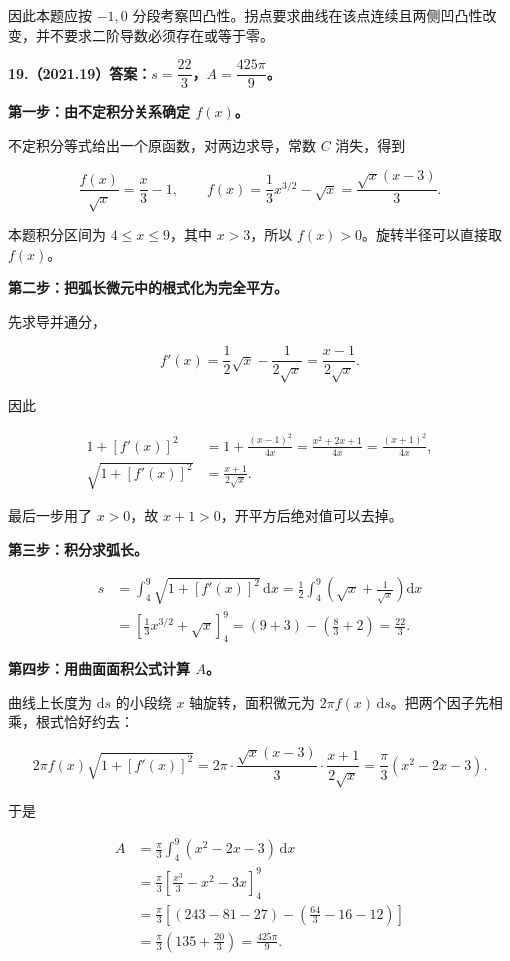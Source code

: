 \documentclass[UTF8,11pt,fontset=windows]{ctexart}
\begin{document}
因此本题应按 $-1,0$ 分段考察凹凸性。拐点要求曲线在该点连续且两侧凹凸性改变，并不要求二阶导数必须存在或等于零。

\clearpage

\textbf{19.（2021.19）答案：$s=\dfrac{22}{3}$，$A=\dfrac{425\pi}{9}$。}

\textbf{第一步：由不定积分关系确定 $f(x)$。}

不定积分等式给出一个原函数，对两边求导，常数 $C$ 消失，得到

$$
\frac{f(x)}{\sqrt x}=\frac x3-1,
\qquad f(x)=\frac13x^{3/2}-\sqrt x=\frac{\sqrt x(x-3)}3.
$$

本题积分区间为 $4\le x\le9$，其中 $x>3$，所以 $f(x)>0$。旋转半径可以直接取 $f(x)$。

\textbf{第二步：把弧长微元中的根式化为完全平方。}

先求导并通分，

$$
f'(x)=\frac12\sqrt x-\frac1{2\sqrt x}
=\frac{x-1}{2\sqrt x}.
$$

因此

$$
\begin{aligned}
1+[f'(x)]^2
&=1+\frac{(x-1)^2}{4x}
=\frac{x^2+2x+1}{4x}=\frac{(x+1)^2}{4x},\\
\sqrt{1+[f'(x)]^2}&=\frac{x+1}{2\sqrt x}.
\end{aligned}
$$

最后一步用了 $x>0$，故 $x+1>0$，开平方后绝对值可以去掉。

\textbf{第三步：积分求弧长。}

$$
\begin{aligned}
s&=\int_4^9\sqrt{1+[f'(x)]^2}\,\mathrm dx
=\frac12\int_4^9\left(\sqrt x+\frac1{\sqrt x}\right)\mathrm dx\\
&=\left[\frac13x^{3/2}+\sqrt x\right]_4^9
=(9+3)-\left(\frac83+2\right)
=\boxed{\frac{22}{3}}.
\end{aligned}
$$

\textbf{第四步：用曲面面积公式计算 $A$。}

曲线上长度为 $\mathrm ds$ 的小段绕 $x$ 轴旋转，面积微元为 $2\pi f(x)\,\mathrm ds$。把两个因子先相乘，根式恰好约去：

$$
2\pi f(x)\sqrt{1+[f'(x)]^2}
=2\pi\cdot\frac{\sqrt x(x-3)}3\cdot\frac{x+1}{2\sqrt x}
=\frac\pi3(x^2-2x-3).
$$

于是

$$
\begin{aligned}
A&=\frac\pi3\int_4^9(x^2-2x-3)\,\mathrm dx\\
&=\frac\pi3\left[\frac{x^3}{3}-x^2-3x\right]_4^9\\
&=\frac\pi3\left[\left(243-81-27\right)
-\left(\frac{64}{3}-16-12\right)\right]\\
&=\frac\pi3\left(135+\frac{20}{3}\right)=\boxed{\frac{425\pi}{9}}.
\end{aligned}
$$
\end{document}
